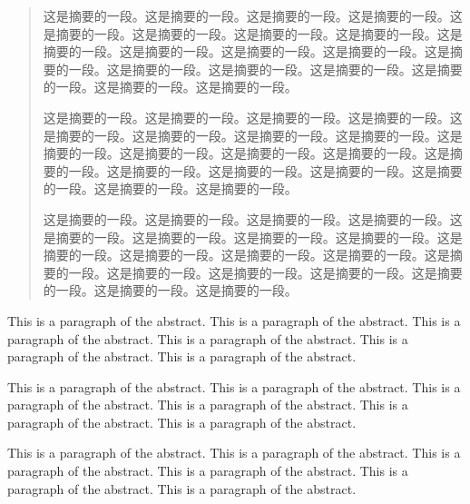 \documentclass{yacaugrad}
\begin{document}

\makecover

\emptypage




\begin{abstract}
  这是摘要的一段。这是摘要的一段。这是摘要的一段。这是摘要的一段。这是摘要的一段。这是摘要的一段。这是摘要的一段。这是摘要的一段。这是摘要的一段。这是摘要的一段。这是摘要的一段。这是摘要的一段。这是摘要的一段。这是摘要的一段。这是摘要的一段。这是摘要的一段。这是摘要的一段。这是摘要的一段。这是摘要的一段。

  这是摘要的一段。这是摘要的一段。这是摘要的一段。这是摘要的一段。这是摘要的一段。这是摘要的一段。这是摘要的一段。这是摘要的一段。这是摘要的一段。这是摘要的一段。这是摘要的一段。这是摘要的一段。这是摘要的一段。这是摘要的一段。这是摘要的一段。这是摘要的一段。这是摘要的一段。这是摘要的一段。这是摘要的一段。

  这是摘要的一段。这是摘要的一段。这是摘要的一段。这是摘要的一段。这是摘要的一段。这是摘要的一段。这是摘要的一段。这是摘要的一段。这是摘要的一段。这是摘要的一段。这是摘要的一段。这是摘要的一段。这是摘要的一段。这是摘要的一段。这是摘要的一段。这是摘要的一段。这是摘要的一段。这是摘要的一段。这是摘要的一段。

\end{abstract}

\begin{abstract*}
  This is a paragraph of the abstract. This is a paragraph of the abstract. This is a paragraph of the abstract. This is a paragraph of the abstract. This is a paragraph of the abstract. This is a paragraph of the abstract.

  This is a paragraph of the abstract. This is a paragraph of the abstract. This is a paragraph of the abstract. This is a paragraph of the abstract. This is a paragraph of the abstract. This is a paragraph of the abstract.

  This is a paragraph of the abstract. This is a paragraph of the abstract. This is a paragraph of the abstract. This is a paragraph of the abstract. This is a paragraph of the abstract. This is a paragraph of the abstract.
\end{abstract*}
\end{document}
